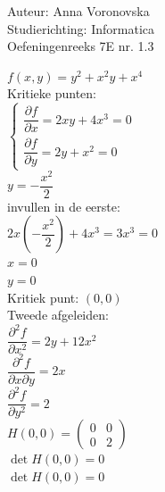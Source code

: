 \documentclass[a4paper]{article}
\begin{document}
  
\noindent \large Auteur: Anna Voronovska \\
\noindent \large Studierichting: Informatica\\
\noindent \large Oefeningenreeks 7E nr. 1.3\\

\medskip

\normalsize

$f(x,y) = y^2 + x^2y + x^4$\\

Kritieke punten:\\

$\left\{ \begin{array}{l} \dfrac{\partial f}{\partial x} = 2xy + 4x^3 = 0 \\ \dfrac{\partial f}{\partial y} = 2y + x^2 = 0 \end{array} \right.$\\

$y = -\dfrac{x^2}{2}$\\

invullen in de eerste:\\

$2x\left(-\dfrac{x^2}{2}\right) + 4x^3 = 3x^3 = 0$\\

$x = 0$\\

$y = 0$\\

Kritiek punt: $(0,0)$\\

Tweede afgeleiden:\\

$\dfrac{\partial^2 f}{\partial x^2} = 2y+12x^2$\\

$\dfrac{\partial^2 f}{\partial x\partial y} = 2x$\\

$\dfrac{\partial^2 f}{\partial y^2} = 2$\\

$H(0,0) = \left(\begin{array}{cc} 

0 & 0 \\
0 & 2 

\end{array}\right)$\\

$\det H(0,0) = 0$\\

$\det H(0,0) = 0$\\
\end{document}
